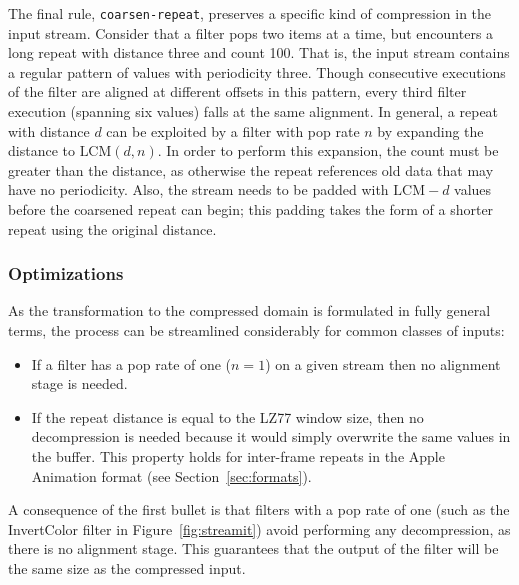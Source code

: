 The final rule, {\tt coarsen-repeat}, preserves a specific kind of
compression in the input stream.  Consider that a filter pops two
items at a time, but encounters a long repeat with distance three and
count 100.  That is, the input stream contains a regular pattern of
values with periodicity three.  Though consecutive executions of the
filter are aligned at different offsets in this pattern, every third
filter execution (spanning six values) falls at the same alignment.
In general, a repeat with distance $d$ can be exploited by a filter
with pop rate $n$ by expanding the distance to $\mbox{LCM}(d, n)$.  In
order to perform this expansion, the count must be greater than the
distance, as otherwise the repeat references old data that may have no
periodicity.  Also, the stream needs to be padded with $\mbox{LCM}-d$
values before the coarsened repeat can begin; this padding takes the
form of a shorter repeat using the original distance.

\subsubsection{Optimizations}
\label{sec:opt}

As the transformation to the compressed domain is formulated in
fully general terms, the process can be streamlined considerably for
common classes of inputs:
\begin{itemize}
\item If a filter has a pop rate of one ($n=1$) on a given stream then
  no alignment stage is needed.
\item If the repeat distance is equal to the LZ77 window size, then no
  decompression is needed because it would simply overwrite the same
  values in the buffer.  This property holds for inter-frame repeats
  in the Apple Animation format (see Section~\ref{sec:formats}).
\end{itemize}
A consequence of the first bullet is that filters with a pop rate of
one (such as the InvertColor filter in Figure~\ref{fig:streamit}) avoid
performing any decompression, as there is no alignment stage.  This
guarantees that the output of the filter will be the same size as the
compressed input.



